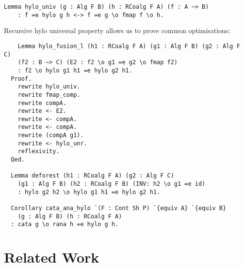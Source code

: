 \documentclass[a4paper, UKenglish, cleveref, autoref, thm-restate]{lipics-v2021}
\begin{document}
\begin{verbatim}
Lemma hylo_univ (g : Alg F B) (h : RCoalg F A) (f : A ~> B)
    : f =e hylo g h <-> f =e g \o fmap f \o h.
\end{verbatim}

Recursive hylo universal property allows us to prove common optimisations:

\begin{verbatim}
    Lemma hylo_fusion_l (h1 : RCoalg F A) (g1 : Alg F B) (g2 : Alg F C)
    (f2 : B ~> C) (E2 : f2 \o g1 =e g2 \o fmap f2)
    : f2 \o hylo g1 h1 =e hylo g2 h1.
  Proof.
    rewrite hylo_univ.
    rewrite fmap_comp.
    rewrite compA.
    rewrite <- E2.
    rewrite <- compA.
    rewrite <- compA.
    rewrite (compA g1).
    rewrite <- hylo_unr.
    reflexivity.
  Qed.

  Lemma deforest (h1 : RCoalg F A) (g2 : Alg F C)
    (g1 : Alg F B) (h2 : RCoalg F B) (INV: h2 \o g1 =e id)
    : hylo g2 h2 \o hylo g1 h1 =e hylo g2 h1.

  Corollary cata_ana_hylo `(F : Cont Sh P) `{equiv A} `{equiv B}
    (g : Alg F B) (h : RCoalg F A)
  : cata g \o rana h =e hylo g h.
\end{verbatim}


\section{Related Work}
\end{document}
